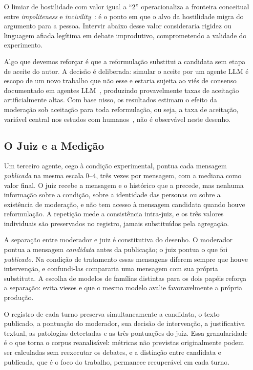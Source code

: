 \documentclass[conference]{IEEEtran} \IEEEoverridecommandlockouts %
\begin{document}
O limiar de hostilidade com valor igual a ``2'' operacionaliza a fronteira conceitual entre \textit{impoliteness} e \textit{incivility}~\cite{papacharissi2004democracy,rossini2022beyond}: é o ponto em que o alvo da hostilidade migra do argumento para a pessoa. Intervir
abaixo desse valor consideraria rigidez ou linguagem afiada legítima em debate improdutivo, comprometendo a validade do experimento.

Algo que devemos reforçar é que a reformulação substitui a candidata sem etapa de aceite do autor. A decisão é deliberada: simular o aceite por um agente LLM é escopo de um novo trabalho que não esse e estaria sujeita ao viés de consenso documentado em agentes LLM~\cite{chuang2023simulating}, produzindo provavelmente
taxas de aceitação artificialmente altas. Com base nisso, os resultados
estimam o efeito da moderação sob aceitação para toda reformulação, ou seja, a taxa de aceitação, variável central nos estudos com humanos~\cite{argyle2023leveraging,katsaros2022reconsidering}, não é observável neste desenho.

\subsection{O Juiz e a Medição}

Um terceiro agente, cego à condição experimental, pontua cada mensagem
\textit{publicada} na mesma escala 0--4, três vezes por mensagem, com a mediana
como valor final. O juiz recebe a mensagem e o histórico que a precede, mas
nenhuma informação sobre a condição, sobre a identidade das personas ou sobre a
existência de moderação, e não tem acesso à mensagem candidata quando houve
reformulação. A repetição mede a consistência intra-juiz, e os três valores
individuais são preservados no registro, jamais substituídos pela agregação.

A separação entre moderador e juiz é constitutiva do desenho. O moderador
pontua a mensagem \textit{candidata} antes da publicação; o juiz pontua o que
foi \textit{publicado}. Na condição de tratamento essas mensagens diferem
sempre que houve intervenção, e confundi-las compararia uma mensagem com sua
própria substituta. A escolha de modelos de famílias distintas para os dois
papéis reforça a separação: evita vieses e que o mesmo modelo avalie favoravelmente a
própria produção.

O registro de cada turno preserva simultaneamente a candidata, o texto
publicado, a pontuação do moderador, sua decisão de intervenção, a justificativa
textual, as patologias detectadas e as três pontuações do juiz. Essa
granularidade é o que torna o corpus reanalisável: métricas não previstas
originalmente podem ser calculadas sem reexecutar os debates, e a distinção
entre candidata e publicada, que é o foco do trabalho,
permanece recuperável em cada turno.
\end{document}
